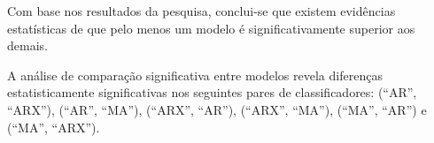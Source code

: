 Com base nos resultados da pesquisa, conclui-se que existem evidências estatísticas de que pelo menos um modelo é significativamente superior aos demais.

A análise de comparação significativa entre modelos revela diferenças estatisticamente significativas nos seguintes pares de classificadores: (``AR'', ``ARX''), (``AR'', ``MA''), (``ARX'', ``AR''), (``ARX'', ``MA''), (``MA'', ``AR'') e (``MA'', ``ARX'').






